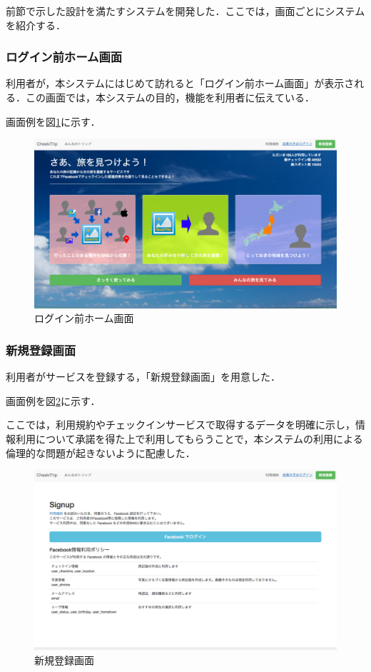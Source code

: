 \documentclass{jsarticle}
\begin{document}
前節で示した設計を満たすシステムを開発した．ここでは，画面ごとにシステムを紹介する．

\subsubsection{ログイン前ホーム画面}

利用者が，本システムにはじめて訪れると「ログイン前ホーム画面」が表示される．この画面では，本システムの目的，機能を利用者に伝えている．

画面例を図\ref{screen_home_before_login}に示す．

\begin{figure}[!ht]
\begin{center}
\includegraphics[width=12.0cm]{./image/cheektrip_top_before_login.png}
\caption{ログイン前ホーム画面}
\label{screen_home_before_login}
\end{center}
\end{figure}

\subsubsection{新規登録画面}

利用者がサービスを登録する，「新規登録画面」を用意した．

画面例を図\ref{screen_signup}に示す．

ここでは，利用規約やチェックインサービスで取得するデータを明確に示し，情報利用について承諾を得た上で利用してもらうことで，本システムの利用による倫理的な問題が起きないように配慮した．

\begin{figure}[!ht]
\begin{center}
\includegraphics[width=12.0cm]{./image/cheekitrip_signup.png}
\caption{新規登録画面}
\label{screen_signup}
\end{center}
\end{figure}
\end{document}
